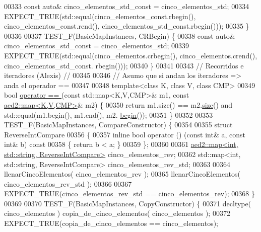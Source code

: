 \begin{DoxyCode}
00333     \textcolor{keyword}{const} \textcolor{keyword}{auto}& cinco\_elementos\_std\_const = cinco\_elementos\_std;
00334     EXPECT\_TRUE(std::equal(cinco\_elementos\_const.rbegin(), cinco\_elementos\_const.rend(), 
      cinco\_elementos\_std\_const.rbegin()));
00335 \}
00336 
00337 TEST\_F(BasicMapInstances, CRBegin) \{
00338     \textcolor{keyword}{const} \textcolor{keyword}{auto}& cinco\_elementos\_std\_const = cinco\_elementos\_std;
00339     EXPECT\_TRUE(std::equal(cinco\_elementos.crbegin(), cinco\_elementos.crend(), cinco\_elementos\_std\_const.
      rbegin()));
00340 \}
00341 
00343 \textcolor{comment}{// Recorridos e iteradores (Alexis) //}
00345 \textcolor{comment}{}
00346 \textcolor{comment}{// Asumo que si andan los iteradores => anda el operador ==}
00347 
00348 \textcolor{keyword}{template}<\textcolor{keyword}{class} K, \textcolor{keyword}{class} V, \textcolor{keyword}{class} CMP>
00349 \textcolor{keywordtype}{bool} \hyperlink{classaed2_1_1map_abfc51b39670220e79037ac067006e933_abfc51b39670220e79037ac067006e933}{operator == }(\textcolor{keyword}{const} std::map<K,V,CMP>& m1, \textcolor{keyword}{const} 
      \hyperlink{classaed2_1_1map}{aed2::map<K,V,CMP>}& m2) \{
00350     \textcolor{keywordflow}{return} m1.size() == m2.\hyperlink{classaed2_1_1map_aa6e806b3be6dc0da79adbfae08b571bf_aa6e806b3be6dc0da79adbfae08b571bf}{size}() and std::equal(m1.begin(), m1.end(), m2.
      \hyperlink{classaed2_1_1map_a58a95705d54b3dda7f775ce5a22225cb_a58a95705d54b3dda7f775ce5a22225cb}{begin}());
00351 \}
00352 
00353 TEST\_F(BasicMapInstances, CompareConstructor) \{
00354 
00355     \textcolor{keyword}{struct }ReverseIntCompare
00356     \{
00357         \textcolor{keyword}{inline} \textcolor{keywordtype}{bool} operator () (\textcolor{keyword}{const} \textcolor{keywordtype}{int}& a, \textcolor{keyword}{const} \textcolor{keywordtype}{int}& b)\textcolor{keyword}{ const}
00358 \textcolor{keyword}{        }\{ \textcolor{keywordflow}{return} b < a; \}
00359     \};
00360 
00361     \hyperlink{classaed2_1_1map}{aed2::map<int, std::string, ReverseIntCompare>} 
      cinco\_elementos\_rev;
00362     std::map<int, std::string, ReverseIntCompare> cinco\_elementos\_rev\_std;
00363 
00364     llenarCincoElementos( cinco\_elementos\_rev );
00365     llenarCincoElementos( cinco\_elementos\_rev\_std );
00366 
00367     EXPECT\_TRUE(cinco\_elementos\_rev\_std == cinco\_elementos\_rev);
00368 \}
00369 
00370 TEST\_F(BasicMapInstances, CopyConstructor) \{
00371     decltype( cinco\_elementos ) copia\_de\_cinco\_elementos( cinco\_elementos );
00372     EXPECT\_TRUE(copia\_de\_cinco\_elementos == cinco\_elementos);

\end{DoxyCode}
